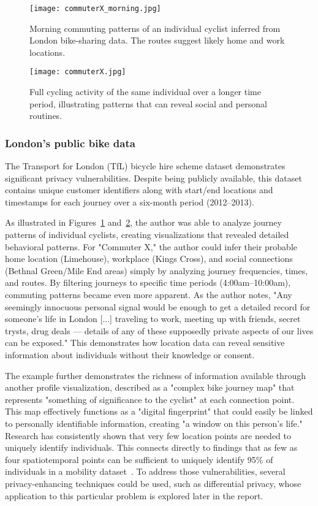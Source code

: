 \documentclass[twocolumn]{article}
\begin{document}
\begin{figure}[h]
    \centering
    \texttt{[image: commuterX\_morning.jpg]}
    \caption{Morning commuting patterns of an individual cyclist inferred from London bike-sharing data. The routes suggest likely home and work locations.}
    \label{fig:commuterX_morning}
\end{figure}

\begin{figure}[h]
    \centering
    \texttt{[image: commuterX.jpg]}
    \caption{Full cycling activity of the same individual over a longer time period, illustrating patterns that can reveal social and personal routines.}
    \label{fig:commuterX_full}
\end{figure}


\subsubsection{London's public bike data}

The Transport for London (TfL) bicycle hire scheme dataset demonstrates significant privacy vulnerabilities. Despite being publicly available, this dataset contains unique customer identifiers along with start/end locations and timestamps for each journey over a six-month period (2012–2013).

As illustrated in Figures~\ref{fig:commuterX_morning} and~\ref{fig:commuterX_full}, the author was able to analyze journey patterns of individual cyclists, creating visualizations that revealed detailed behavioral patterns. For "Commuter X," the author could infer their probable home location (Limehouse), workplace (Kings Cross), and social connections (Bethnal Green/Mile End areas) simply by analyzing journey frequencies, times, and routes. By filtering journeys to specific time periods (4:00am–10:00am), commuting patterns became even more apparent. As the author notes, "Any seemingly innocuous personal signal would be enough to get a detailed record for someone's life in London [...] traveling to work, meeting up with friends, secret trysts, drug deals — details of any of these supposedly private aspects of our lives can be exposed." This demonstrates how location data can reveal sensitive information about individuals without their knowledge or consent.

The example further demonstrates the richness of information available through another profile visualization, described as a "complex bike journey map" that represents "something of significance to the cyclist" at each connection point. This map effectively functions as a "digital fingerprint" that could easily be linked to personally identifiable information, creating "a window on this person's life." Research has consistently shown that very few location points are needed to uniquely identify individuals. This connects directly to findings that as few as four spatiotemporal points can be sufficient to uniquely identify 95\% of individuals in a mobility dataset~\cite{montjoye2013unique}.
To address those vulnerabilities, several privacy-enhancing techniques could be used, such as differential privacy, whose application to this particular problem is explored later in the report.
\end{document}
